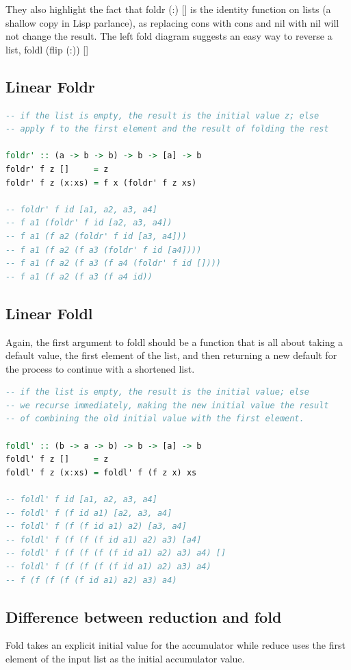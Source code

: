 They also highlight the fact that foldr (:) [] is the identity function on lists (a shallow copy in Lisp parlance), as replacing cons with cons and nil with nil will not change the result. The left fold diagram suggests an easy way to reverse a list, foldl (flip (:)) []

\clearpage
\subsection{Linear Foldr}
\begin{lstlisting}[language=Haskell]
-- if the list is empty, the result is the initial value z; else
-- apply f to the first element and the result of folding the rest

foldr' :: (a -> b -> b) -> b -> [a] -> b
foldr' f z []     = z 
foldr' f z (x:xs) = f x (foldr' f z xs) 

-- foldr' f id [a1, a2, a3, a4]
-- f a1 (foldr' f id [a2, a3, a4])
-- f a1 (f a2 (foldr' f id [a3, a4]))
-- f a1 (f a2 (f a3 (foldr' f id [a4])))
-- f a1 (f a2 (f a3 (f a4 (foldr' f id [])))
-- f a1 (f a2 (f a3 (f a4 id))
\end{lstlisting}

\subsection{Linear Foldl}

Again, the first argument to foldl should be a function that is all about taking a default value, the first element of the list, and then returning a new default for the process to continue with a shortened list.

\begin{lstlisting}[language=Haskell]
-- if the list is empty, the result is the initial value; else
-- we recurse immediately, making the new initial value the result
-- of combining the old initial value with the first element.

foldl' :: (b -> a -> b) -> b -> [a] -> b
foldl' f z []     = z                  
foldl' f z (x:xs) = foldl' f (f z x) xs

-- foldl' f id [a1, a2, a3, a4]
-- foldl' f (f id a1) [a2, a3, a4]
-- foldl' f (f (f id a1) a2) [a3, a4]
-- foldl' f (f (f (f id a1) a2) a3) [a4]
-- foldl' f (f (f (f (f id a1) a2) a3) a4) []
-- foldl' f (f (f (f (f id a1) a2) a3) a4)
-- f (f (f (f (f id a1) a2) a3) a4)
\end{lstlisting}

\subsection{Difference between reduction and fold}
Fold takes an explicit initial value for the accumulator while reduce uses the first element of the input list as the initial accumulator value.

